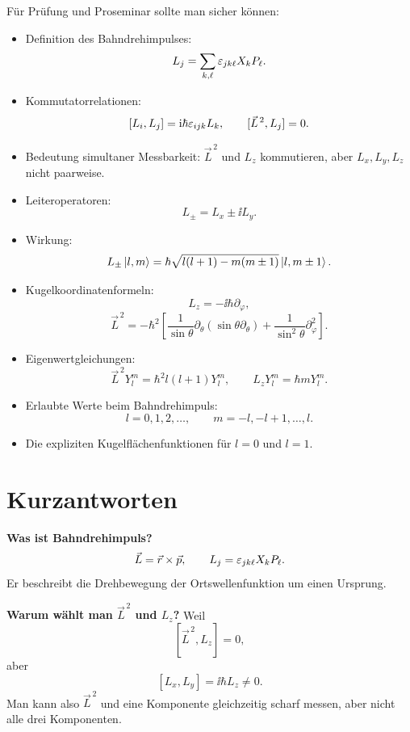 \begin{examtipbox}
Für Prüfung und Proseminar sollte man sicher können:
\begin{itemize}
    \item Definition des Bahndrehimpulses:
    \[
        L_j=\sum_{k,\ell}\varepsilon_{jk\ell}X_kP_\ell.
    \]
    \item Kommutatorrelationen:
    \[
        [L_i,L_j]=\mathrm{i}\hbar\varepsilon_{ijk}L_k,
        \qquad
        [\vec L^{\,2},L_j]=0.
    \]
    \item Bedeutung simultaner Messbarkeit: \(\vec L^{\,2}\) und \(L_z\) kommutieren, aber \(L_x,L_y,L_z\) nicht paarweise.
    \item Leiteroperatoren:
    \[
        L_\pm=L_x\pm\ii L_y.
    \]
    \item Wirkung:
    \[
        L_\pm\left|l,m\right\rangle
        =\hbar\sqrt{l(l+1)-m(m\pm1)}\left|l,m\pm1\right\rangle.
    \]
    \item Kugelkoordinatenformeln:
    \[
        L_z=-\ii\hbar\partial_\varphi,
    \]
    \[
        \vec L^{\,2}
        =-\hbar^2\left[
        \frac{1}{\sin\theta}\partial_\theta(\sin\theta\partial_\theta)
        +\frac{1}{\sin^2\theta}\partial_\varphi^2
        \right].
    \]
    \item Eigenwertgleichungen:
    \[
        \vec L^{\,2}Y_l^m=\hbar^2l(l+1)Y_l^m,
        \qquad
        L_zY_l^m=\hbar mY_l^m.
    \]
    \item Erlaubte Werte beim Bahndrehimpuls:
    \[
        l=0,1,2,\dots,
        \qquad
        m=-l,-l+1,\dots,l.
    \]
    \item Die expliziten Kugelflächenfunktionen für \(l=0\) und \(l=1\).
\end{itemize}
\end{examtipbox}

\section{Kurzantworten}

\begin{answerbox}
\textbf{Was ist Bahndrehimpuls?}
\[
    \vec L=\vec r\times\vec p,
    \qquad
    L_j=\varepsilon_{jk\ell}X_kP_\ell.
\]
Er beschreibt die Drehbewegung der Ortswellenfunktion um einen Ursprung.
\end{answerbox}

\begin{answerbox}
\textbf{Warum wählt man \(\vec L^{\,2}\) und \(L_z\)?}
Weil
\[
    [\vec L^{\,2},L_z]=0,
\]
aber
\[
    [L_x,L_y]=\ii\hbar L_z\neq 0.
\]
Man kann also \(\vec L^{\,2}\) und eine Komponente gleichzeitig scharf messen, aber nicht alle drei Komponenten.
\end{answerbox}

